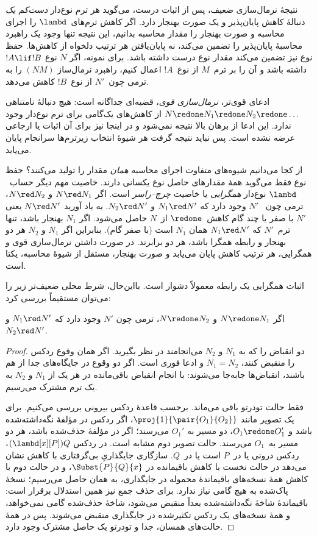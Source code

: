 \documentclass[../../../include/open-logic-section]{subfiles}
\begin{document}
نتیجهٔ نرمال‌سازی ضعیف، پس از اثبات درست، می‌گوید هر ترم نوع‌دار
\emph{دست‌کم یک} دنبالهٔ کاهش پایان‌پذیر و یک صورت بهنجار دارد. اگر
کاهش ترم‌های~$\lambd$ را اجرای محاسبه و صورت بهنجار را مقدار محاسبه
بدانیم، این نتیجه تنها وجود یک راهبرد محاسبهٔ پایان‌پذیر را تضمین
می‌کند، نه پایان‌یافتن هر ترتیب دلخواه از کاهش‌ها. حفظ نوع نیز تضمین
می‌کند مقدار نوع درست داشته باشد. برای نمونه، اگر $N$ نوع
$!A \lif !B$ داشته باشد و آن را بر ترم~$M$ از نوع~$!A$ اعمال کنیم،
راهبرد نرمال‌ساز $(NM)$ را به ترمی چون~$N'$ از نوع~$!B$ کاهش می‌دهد.

ادعای قوی‌تر، \emph{نرمال‌سازی قوی}، قضیه‌ای جداگانه است: هیچ دنبالهٔ
نامتناهی
$N \redone N_1 \redone N_2 \redone \dots$
از کاهش‌های یک‌گامی برای ترم نوع‌دار وجود ندارد. این ادعا از برهان
بالا نتیجه نمی‌شود و در اینجا نیز برای آن اثبات یا ارجاعی عرضه نشده
است. پس نباید نتیجه گرفت هر شیوهٔ انتخاب زیرترم‌ها سرانجام پایان
می‌یابد.

از کجا می‌دانیم شیوه‌های متفاوت اجرای محاسبه \emph{همان} مقدار را
تولید می‌کنند؟ حفظ نوع فقط می‌گوید همهٔ مقدارهای حاصل نوع یکسانی دارند.
خاصیت مهم دیگر حساب~$\lambd$ نوع‌دار \emph{همگرایی} یا خاصیت
\emph{چرچ--راسر} است. اگر $N \red N_1$ و $N \red N_2$، ترمی چون
~$N'$ وجود دارد که $N_1 \red N'$ و $N_2 \red N'$. به یاد آورید
$N \red N'$ یعنی $N'$ با صفر یا چند گام کاهش~$\redone$ از~$N$ حاصل
می‌شود. اگر $N_1$ بهنجار باشد، تنها ترم~$N'$ که
$N_1 \red N'$ همان $N_1$ است (با صفر گام). بنابراین اگر $N_1$ و
$N_2$ هر دو بهنجار و رابطه همگرا باشد، هر دو برابرند. در صورت داشتن
نرمال‌سازی قوی و همگرایی، هر ترتیب کاهش پایان می‌یابد و صورت بهنجار،
مستقل از شیوهٔ محاسبه، یکتا است.

اثبات همگرایی یک رابطه معمولاً دشوار است. بااین‌حال، شرط محلی ضعیف‌تر
زیر را می‌توان مستقیماً بررسی کرد:

\begin{prop}
اگر $N \redone N_1$ و $N \redone N_2$، ترمی چون $N'$ وجود دارد که
$N_1 \red N'$ و $N_2 \red N'$.
\end{prop}

\begin{proof}
  دو انقباض را که به $N_1$ و $N_2$ می‌انجامند در نظر بگیرید. اگر
  همان وقوع ردکس را منقبض کنند، $N_1=N_2$ و ادعا فوری است. اگر دو
  وقوع در جایگاه‌های جدا از هم باشند، انقباض‌ها جابه‌جا می‌شوند:
  با انجام انقباض باقی‌مانده در هر یک از $N_1$ و $N_2$ به یک ترم
  مشترک می‌رسیم.

  فقط حالت تودرتو باقی می‌ماند. برحسب قاعدهٔ ردکس بیرونی بررسی
  می‌کنیم. برای یک تصویر مانند $\proj{1}{\pair{O_1}{O_2}}$، اگر ردکس
  در مؤلفهٔ نگه‌داشته‌شده باشد و $O_1 \redone O_1'$، دو مسیر به
  $O_1'$ می‌رسند؛ اگر در مؤلفهٔ حذف‌شده باشد، هر دو مسیر به~$O_1$
  می‌رسند. حالت تصویر دوم مشابه است. در ردکس
  $(\lambd[x][P])Q$، ردکس درونی یا در~$P$ است یا در~$Q$. سازگاری
  جایگذاریِ بی‌گرفتاری با کاهش نشان می‌دهد در حالت نخست با کاهش باقیمانده
  در $\Subst{P}{Q}{x}$، و در حالت دوم با کاهش همهٔ نسخه‌های باقیماندهٔ
  محموله در جایگذاری، به همان حاصل می‌رسیم؛ نسخهٔ پاک‌شده به هیچ گامی
  نیاز ندارد. برای حذف جمع نیز همین استدلال برقرار است: باقیماندهٔ
  شاخهٔ نگه‌داشته‌شده بعداً منقبض می‌شود، شاخهٔ حذف‌شده گامی نمی‌خواهد،
  و همهٔ نسخه‌های یک ردکس تکثیرشده در جایگذاری منقبض می‌شوند. پس در
  همهٔ حالت‌های همسان، جدا و تودرتو یک حاصل مشترک وجود دارد.
\end{proof}
\end{document}
